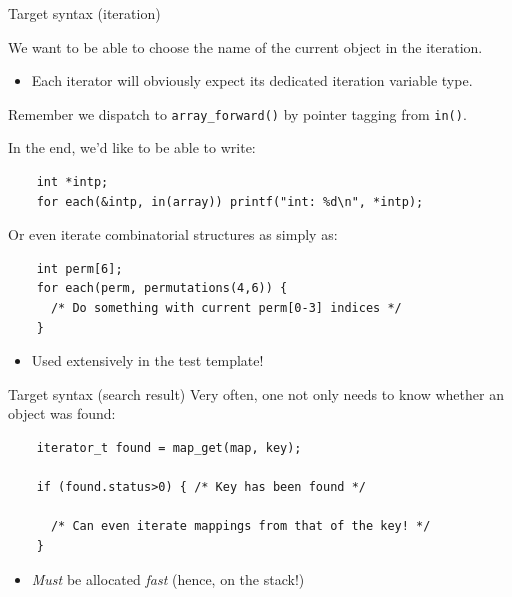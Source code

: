 \begin{frame}[fragile]{Target syntax (iteration)}

  We want to be able to choose the name of the current object in the iteration.
  \begin{itemize}
  \item Each iterator will obviously expect its dedicated iteration variable type.
  \end{itemize}

  Remember we dispatch to \lstinline{array_forward()} by pointer tagging from \lstinline{in()}.

  In the end, we'd like to be able to write:
  \begin{lstlisting}
    int *intp;
    for each(&intp, in(array)) printf("int: %d\n", *intp);
  \end{lstlisting}

  Or even iterate combinatorial structures as simply as:
  \begin{lstlisting}
    int perm[6];
    for each(perm, permutations(4,6)) {
      /* Do something with current perm[0-3] indices */
    }
  \end{lstlisting}

  \begin{itemize}
  \item Used extensively in the test template!
  \end{itemize}

\end{frame}


\begin{frame}[fragile]{Target syntax (search result)}
  Very often, one not only needs to know whether an object was found:

  \begin{lstlisting}
    iterator_t found = map_get(map, key);

    if (found.status>0) { /* Key has been found */

      /* Can even iterate mappings from that of the key! */
    }
  \end{lstlisting}

  \begin{itemize}
  \item {\em Must} be allocated {\em fast} (hence, on the stack!)
  \end{itemize}

\end{frame}


